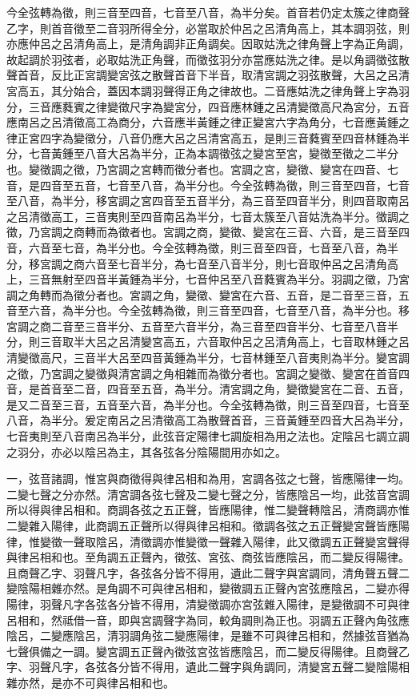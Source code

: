 \begin{pinyinscope}
今全弦轉為徵，則三音至四音，七音至八音，為半分矣。首音若仍定太簇之律商聲乙字，則首音徵至二音羽所得全分，必當取於仲呂之呂清角高上，其本調羽弦，則亦應仲呂之呂清角高上，是清角調非正角調矣。因取姑洗之律角聲上字為正角調，故起調於羽弦者，必取姑洗正角聲，而徵弦羽分亦當應姑洗之律。是以角調徵弦散聲首音，反比正宮調變宮弦之散聲首音下半音，取清宮調之羽弦散聲，大呂之呂清宮高五，其分始合，蓋因本調羽聲得正角之律故也。二音應姑洗之律角聲上字為羽分，三音應蕤賓之律變徵尺字為變宮分，四音應林鍾之呂清變徵高尺為宮分，五音應南呂之呂清徵高工為商分，六音應半黃鍾之律正變宮六字為角分，七音應黃鍾之律正宮四字為變徵分，八音仍應大呂之呂清宮高五，是則三音蕤賓至四音林鍾為半分，七音黃鍾至八音大呂為半分，正為本調徵弦之變宮至宮，變徵至徵之二半分也。變徵調之徵，乃宮調之宮轉而徵分者也。宮調之宮，變徵、變宮在四音、七音，是四音至五音，七音至八音，為半分也。今全弦轉為徵，則三音至四音，七音至八音，為半分，移宮調之宮四音至五音半分，為三音至四音半分，則四音取南呂之呂清徵高工，三音夷則至四音南呂為半分，七音太簇至八音姑洗為半分。徵調之徵，乃宮調之商轉而為徵者也。宮調之商，變徵、變宮在三音、六音，是三音至四音，六音至七音，為半分也。今全弦轉為徵，則三音至四音，七音至八音，為半分，移宮調之商六音至七音半分，為七音至八音半分，則七音取仲呂之呂清角高上，三音無射至四音半黃鍾為半分，七音仲呂至八音蕤賓為半分。羽調之徵，乃宮調之角轉而為徵分者也。宮調之角，變徵、變宮在六音、五音，是二音至三音，五音至六音，為半分也。今全弦轉為徵，則三音至四音，七音至八音，為半分也。移宮調之商二音至三音半分、五音至六音半分，為三音至四音半分、七音至八音半分，則三音取半大呂之呂清變宮高五，六音取仲呂之呂清角高上，七音取林鍾之呂清變徵高尺，三音半大呂至四音黃鍾為半分，七音林鍾至八音夷則為半分。變宮調之徵，乃宮調之變徵與清宮調之角相雜而為徵分者也。宮調之變徵、變宮在首音四音，是首音至二音，四音至五音，為半分。清宮調之角，變徵變宮在二音、五音，是又二音至三音，五音至六音，為半分也。今全弦轉為徵，則三音至四音，七音至八音，為半分。爰定南呂之呂清徵高工為散聲首音，三音黃鍾至四音大呂為半分，七音夷則至八音南呂為半分，此弦音定陽律七調旋相為用之法也。定陰呂七調立調之羽分，亦必以陰呂為主，其各弦各分陰陽間用亦如之。

一，弦音諸調，惟宮與商徵得與律呂相和為用，宮調各弦之七聲，皆應陽律一均。二變七聲之分亦然。清宮調各弦七聲及二變七聲之分，皆應陰呂一均，此弦音宮調所以得與律呂相和。商調各弦之五正聲，皆應陽律，惟二變聲轉陰呂，清商調亦惟二變雜入陽律，此商調五正聲所以得與律呂相和。徵調各弦之五正聲變宮聲皆應陽律，惟變徵一聲取陰呂，清徵調亦惟變徵一聲雜入陽律，此又徵調五正聲變宮聲得與律呂相和也。至角調五正聲內，徵弦、宮弦、商弦皆應陰呂，而二變反得陽律。且商聲乙字、羽聲凡字，各弦各分皆不得用，遺此二聲字與宮調同，清角聲五聲二變陰陽相雜亦然。是角調不可與律呂相和，變徵調五正聲內宮弦應陰呂，二變亦得陽律，羽聲凡字各弦各分皆不得用，清變徵調亦宮弦雜入陽律，是變徵調不可與律呂相和，然祗借一音，即與宮調聲字為同，較角調則為正也。羽調五正聲內角弦應陰呂，二變應陰呂，清羽調角弦二變應陽律，是雖不可與律呂相和，然據弦音猶為七聲俱備之一調。變宮調五正聲內徵弦宮弦皆應陰呂，而二變反得陽律。且商聲乙字、羽聲凡字，各弦各分皆不得用，遺此二聲字與角調同，清變宮五聲二變陰陽相雜亦然，是亦不可與律呂相和也。


\end{pinyinscope}

